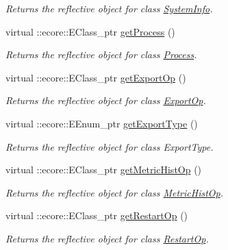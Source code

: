 \begin{DoxyCompactItemize}
\begin{DoxyCompactList}\small\item\em Returns the reflective object for class \hyperlink{classIMS__Data_1_1SystemInfo}{SystemInfo}. \item\end{DoxyCompactList}\item 
virtual ::ecore::EClass\_\-ptr \hyperlink{classIMS__Data_1_1IMS__DataPackage_a1b3eb82edbb104b0e405c8befa624aa5}{getProcess} ()
\begin{DoxyCompactList}\small\item\em Returns the reflective object for class \hyperlink{classIMS__Data_1_1Process}{Process}. \item\end{DoxyCompactList}\item 
virtual ::ecore::EClass\_\-ptr \hyperlink{classIMS__Data_1_1IMS__DataPackage_a68d634a005ac30ae090268e03ecb96f3}{getExportOp} ()
\begin{DoxyCompactList}\small\item\em Returns the reflective object for class \hyperlink{classIMS__Data_1_1ExportOp}{ExportOp}. \item\end{DoxyCompactList}\item 
virtual ::ecore::EEnum\_\-ptr \hyperlink{classIMS__Data_1_1IMS__DataPackage_a52d478d5b18bf97fd2e505a0af741b71}{getExportType} ()
\begin{DoxyCompactList}\small\item\em Returns the reflective object for class ExportType. \item\end{DoxyCompactList}\item 
virtual ::ecore::EClass\_\-ptr \hyperlink{classIMS__Data_1_1IMS__DataPackage_ae6aab58e0bd6976ee767f94be71378e1}{getMetricHistOp} ()
\begin{DoxyCompactList}\small\item\em Returns the reflective object for class \hyperlink{classIMS__Data_1_1MetricHistOp}{MetricHistOp}. \item\end{DoxyCompactList}\item 
virtual ::ecore::EClass\_\-ptr \hyperlink{classIMS__Data_1_1IMS__DataPackage_aff2edf19863a6d96e3c922450fe21f9d}{getRestartOp} ()
\begin{DoxyCompactList}\small\item\em Returns the reflective object for class \hyperlink{classIMS__Data_1_1RestartOp}{RestartOp}. \item\end{DoxyCompactList}\item 

\end{DoxyCompactItemize}
